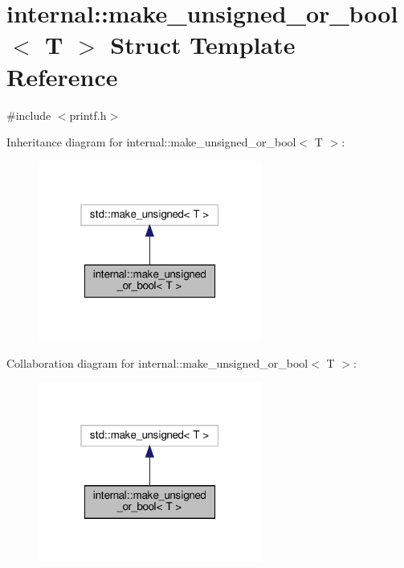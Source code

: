 \hypertarget{structinternal_1_1make__unsigned__or__bool}{}\section{internal\+:\+:make\+\_\+unsigned\+\_\+or\+\_\+bool$<$ T $>$ Struct Template Reference}
\label{structinternal_1_1make__unsigned__or__bool}


{\ttfamily \#include $<$printf.\+h$>$}



Inheritance diagram for internal\+:\+:make\+\_\+unsigned\+\_\+or\+\_\+bool$<$ T $>$\+:
\nopagebreak
\begin{figure}[H]
\begin{center}
\leavevmode
\includegraphics[width=208pt]{structinternal_1_1make__unsigned__or__bool__inherit__graph}
\end{center}
\end{figure}


Collaboration diagram for internal\+:\+:make\+\_\+unsigned\+\_\+or\+\_\+bool$<$ T $>$\+:
\nopagebreak
\begin{figure}[H]
\begin{center}
\leavevmode
\includegraphics[width=208pt]{structinternal_1_1make__unsigned__or__bool__coll__graph}
\end{center}
\end{figure}



